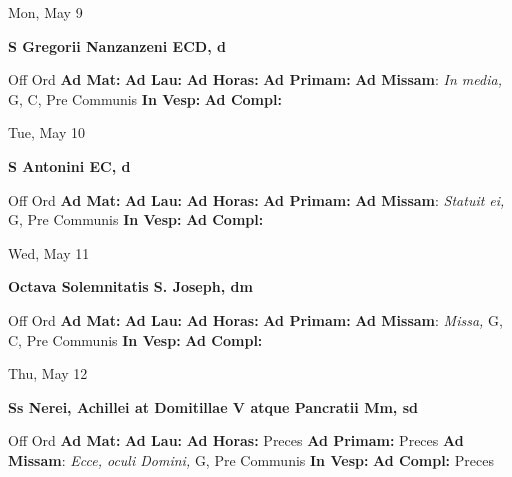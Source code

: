 \documentclass[10pt]{article}
\begin{document}
\begin{minipage}{3.5in}
\vspace{2em}\begin{center}
Mon, May 9
\end{center}\textbf{ \large S Gregorii Nanzanzeni ECD, \textnormal{\normalsize d}}
\begin{justify}
Off Ord
\textbf{Ad Mat: }
\textbf{Ad Lau: }
\textbf{Ad Horas: }
\textbf{Ad Primam: }
\textbf{Ad Missam}: \textit{In media,} G, C, Pre Communis
\textbf{In Vesp: }
\textbf{Ad Compl: }\end{justify}
\end{minipage}



\begin{minipage}{3.5in}
\vspace{2em}\begin{center}
Tue, May 10
\end{center}\textbf{ \large S Antonini EC, \textnormal{\normalsize d}}
\begin{justify}
Off Ord
\textbf{Ad Mat: }
\textbf{Ad Lau: }
\textbf{Ad Horas: }
\textbf{Ad Primam: }
\textbf{Ad Missam}: \textit{Statuit ei,} G, Pre Communis
\textbf{In Vesp: }
\textbf{Ad Compl: }\end{justify}
\end{minipage}



\begin{minipage}{3.5in}
\vspace{2em}\begin{center}
Wed, May 11
\end{center}\textbf{ \large Octava Solemnitatis S. Joseph, \textnormal{\normalsize dm}}
\begin{justify}
Off Ord
\textbf{Ad Mat: }
\textbf{Ad Lau: }
\textbf{Ad Horas: }
\textbf{Ad Primam: }
\textbf{Ad Missam}: \textit{Missa,} G, C, Pre Communis
\textbf{In Vesp: }
\textbf{Ad Compl: }\end{justify}
\end{minipage}



\begin{minipage}{3.5in}
\vspace{2em}\begin{center}
Thu, May 12
\end{center}\textbf{ \large Ss Nerei, Achillei at Domitillae V atque Pancratii Mm, \textnormal{\normalsize sd}}
\begin{justify}
Off Ord
\textbf{Ad Mat: }
\textbf{Ad Lau: }
\textbf{Ad Horas: }Preces
\textbf{Ad Primam: }Preces
\textbf{Ad Missam}: \textit{Ecce, oculi Domini,} G, Pre Communis
\textbf{In Vesp: }
\textbf{Ad Compl: }Preces\end{justify}
\end{minipage}
\end{document}
